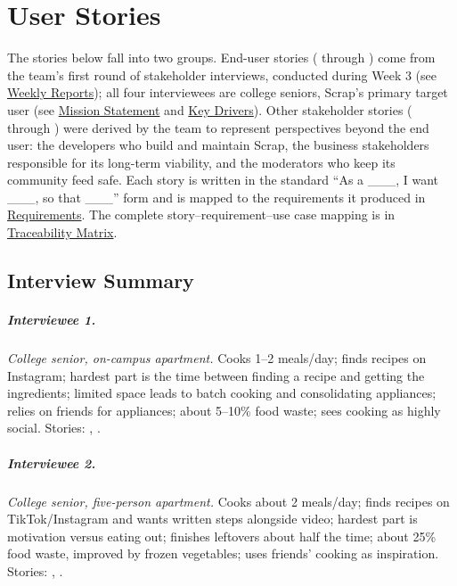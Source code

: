 \chapter{User Stories}

\noindent The stories below fall into two groups. End-user stories ( through ) come from the team's first round of stakeholder interviews, conducted during Week 3 (see \hyperref[Chapter:WeeklyReports]{Weekly Reports}); all four interviewees are college seniors, Scrap's primary target user (see \hyperref[Chapter:MissionStatement]{Mission Statement} and \hyperref[Chapter:KeyDrivers]{Key Drivers}). Other stakeholder stories ( through ) were derived by the team to represent perspectives beyond the end user: the developers who build and maintain Scrap, the business stakeholders responsible for its long-term viability, and the moderators who keep its community feed safe. Each story is written in the standard ``As a \_\_\_, I want \_\_\_, so that \_\_\_'' form and is mapped to the requirements it produced in \hyperref[Chapter:Requirements]{Requirements}. The complete story--requirement--use case mapping is in \hyperref[Chapter:Traceability]{Traceability Matrix}.

\section{Interview Summary}

\paragraph{Interviewee 1.} \textit{College senior, on-campus apartment.} Cooks 1--2 meals/day; finds recipes on Instagram; hardest part is the time between finding a recipe and getting the ingredients; limited space leads to batch cooking and consolidating appliances; relies on friends for appliances; about 5--10\% food waste; sees cooking as highly social. Stories: , .

\paragraph{Interviewee 2.} \textit{College senior, five-person apartment.} Cooks about 2 meals/day; finds recipes on TikTok/Instagram and wants written steps alongside video; hardest part is motivation versus eating out; finishes leftovers about half the time; about 25\% food waste, improved by frozen vegetables; uses friends' cooking as inspiration. Stories: , .

